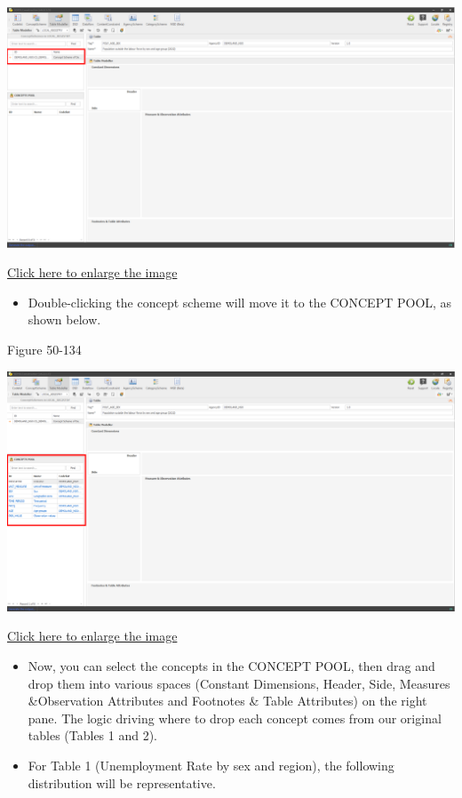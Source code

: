\documentclass[
]{book}
\providecommand{\tightlist}{%
  \setlength{\itemsep}{0pt}\setlength{\parskip}{0pt}}
\theoremstyle{definition}
\theoremstyle{definition}
\theoremstyle{definition}
\theoremstyle{definition}
\theoremstyle{remark}
\begin{document}
\begin{center}\includegraphics[width=1\linewidth]{./images/image132} \end{center}

\href{images/image132.png}{Click here to enlarge the image}

\begin{itemize}
\tightlist
\item
  Double-clicking the concept scheme will move it to the CONCEPT POOL, as shown below.
\end{itemize}

Figure 50-134

\begin{center}\includegraphics[width=1\linewidth]{./images/image134} \end{center}

\href{images/image134.png}{Click here to enlarge the image}

\begin{itemize}
\item
  Now, you can select the concepts in the CONCEPT POOL, then drag and drop them into various spaces (Constant Dimensions, Header, Side, Measures \&Observation Attributes and Footnotes \& Table Attributes) on the right pane. The logic driving where to drop each concept comes from our original tables (Tables 1 and 2).
\item
  For Table 1 (Unemployment Rate by sex and region), the following distribution will be representative.
\end{itemize}
\end{document}
